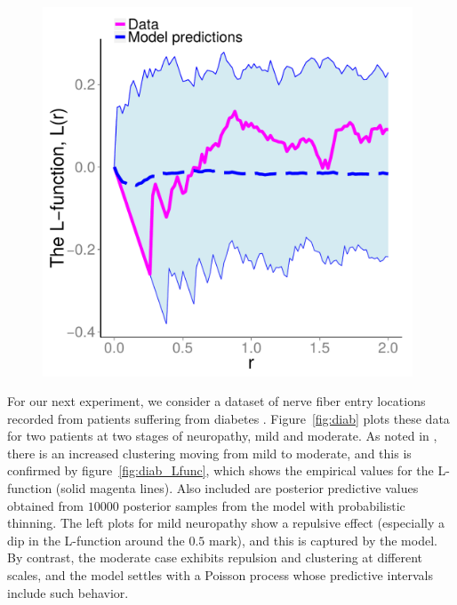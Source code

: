 \documentclass{statsoc}
\begin{document}
\begin{figure}
\begin{minipage}[h]{0.74\linewidth}
\begin{minipage}[h]{0.49\linewidth}
  \end{minipage}
  \begin{minipage}[h]{0.49\linewidth}
  \centering
  \includegraphics[width=0.98\textwidth]{figs/Jfunc_postpred_R10/mod1_gibbs_Lfunc.pdf}
  \end{minipage}
  \end{minipage}
  \end{figure}
For our next experiment, we consider a dataset of nerve fiber entry locations recorded from patients suffering from diabetes  \citep{WallSar11}.
Figure~\ref{fig:diab} plots these data for two patients at two stages of neuropathy, mild and moderate.
  As noted in \cite{WallSar11}, there is an increased clustering moving from mild to moderate, and this is confirmed by figure~\ref{fig:diab_Lfunc}, 
  which shows the empirical values for the L-function (solid magenta lines).
  Also included are posterior predictive values obtained from $10000$ posterior samples from the \matern model with probabilistic
  thinning. 
  The left plots for mild neuropathy show a repulsive effect (especially a dip in the L-function  around 
  the $0.5$ mark), and this is captured by the model. 
  By contrast, the moderate case exhibits repulsion and clustering at different scales, and the model settles with a Poisson process whose
  predictive intervals include such behavior.
\end{document}
